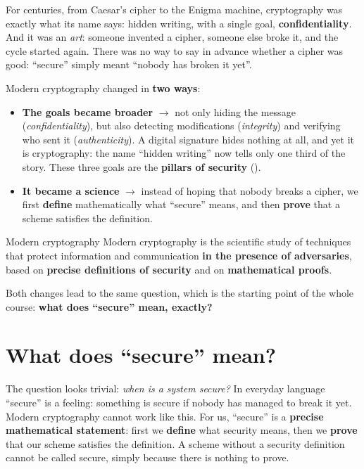 For centuries, from Caesar's cipher to the Enigma machine, cryptography was exactly what its name says: hidden writing, with a single goal, \textbf{confidentiality}. And it was an \textit{art}: someone invented a cipher, someone else broke it, and the cycle started again. There was no way to say in advance whether a cipher was good: ``secure'' simply meant ``nobody has broken it yet''.

Modern cryptography changed in \textbf{two ways}:
\begin{itemize}
  \item \textbf{The goals became broader} $\to$ not only hiding the message (\textit{confidentiality}), but also detecting modifications (\textit{integrity}) and verifying who sent it (\textit{authenticity}). A digital signature hides nothing at all, and yet it is cryptography: the name ``hidden writing'' now tells only one third of the story. These three goals are the \textbf{pillars of security} ().
  \item \textbf{It became a science} $\to$ instead of hoping that nobody breaks a cipher, we first \textbf{define} mathematically what ``secure'' means, and then \textbf{prove} that a scheme satisfies the definition.
\end{itemize}

\begin{frameddefn}{Modern cryptography}
  Modern cryptography is the scientific study of techniques that protect information and communication \textbf{in the presence of adversaries}, based on \textbf{precise definitions of security} and on \textbf{mathematical proofs}.
\end{frameddefn}

Both changes lead to the same question, which is the starting point of the whole course: \textbf{what does ``secure'' mean, exactly?}

\section{What does ``secure'' mean?}

The question looks trivial: \textit{when is a system secure?} In everyday language ``secure'' is a feeling: something is secure if nobody has managed to break it yet. Modern cryptography cannot work like this. For us, ``secure'' is a \textbf{precise mathematical statement}: first we \textbf{define} what security means, then we \textbf{prove} that our scheme satisfies the definition. A scheme without a security definition cannot be called secure, simply because there is nothing to prove.

